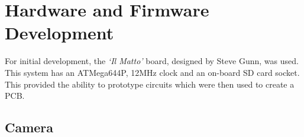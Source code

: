 \chapter{Hardware and Firmware Development} \label{Chapter:HardwareDevelopment}
For initial development, the \textit{`Il Matto'} board, designed by Steve Gunn, was used. This system has an ATMega644P, 12MHz clock and an on-board SD card socket. This provided the ability to prototype circuits which were then used to create a PCB.


\section{Camera} \label{Section:Camera}

